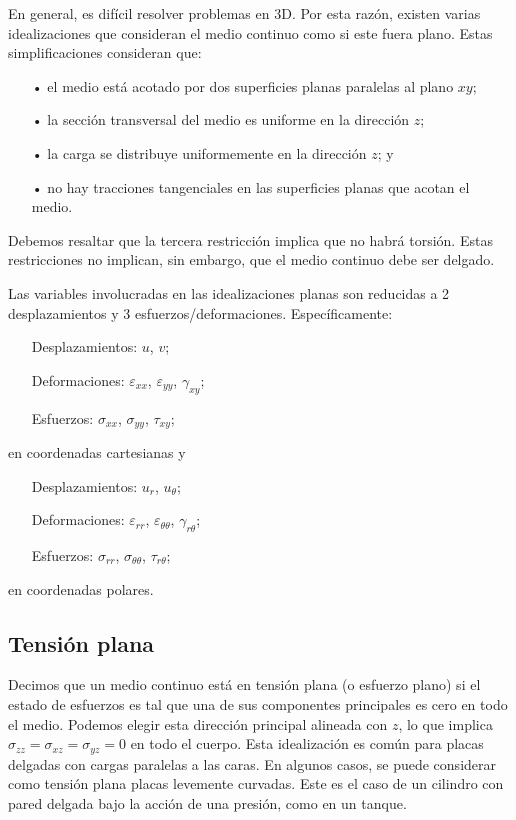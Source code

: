 \documentclass[../notas medios.tex]{subfiles}
\begin{document}
En general, es difícil resolver problemas en 3D. Por esta razón, existen varias idealizaciones que consideran el medio continuo como si este fuera plano. Estas simplificaciones consideran que:
\begin{itemize}
\item[•] el medio está acotado por dos superficies planas paralelas al plano \(xy\);
\item[•] la sección transversal del medio es uniforme en la dirección \(z\);
\item[•] la carga se distribuye uniformemente en la dirección \(z\); y
\item[•] no hay tracciones tangenciales en las superficies planas que acotan el medio.
\end{itemize}
Debemos resaltar que la tercera restricción implica que no habrá torsión. Estas restricciones no implican, sin embargo, que el medio continuo debe ser delgado.

Las variables involucradas en las idealizaciones planas son reducidas a 2 desplazamientos y 3 esfuerzos/deformaciones. Específicamente:
\begin{itemize}
\item[] Desplazamientos: \(u\), \(v\);
\item[] Deformaciones: \(\varepsilon_{xx}\), \(\varepsilon_{yy}\), \(\gamma_{xy}\); 
\item[] Esfuerzos: \(\sigma_{xx}\), \(\sigma_{yy}\), \(\tau_{xy}\);
\end{itemize}
en coordenadas cartesianas y
\begin{itemize}
\item[] Desplazamientos: \(u_r\), \(u_\theta\);
\item[] Deformaciones: \(\varepsilon_{rr}\), \(\varepsilon_{\theta\theta}\), \(\gamma_{r\theta}\); 
\item[] Esfuerzos: \(\sigma_{rr}\), \(\sigma_{\theta\theta}\), \(\tau_{r\theta}\);
\end{itemize}
en coordenadas polares.


\subsection{Tensión plana}
Decimos que un medio continuo está en tensión plana (o esfuerzo plano) si el 
estado de esfuerzos es tal que una de sus componentes principales es cero en 
todo el medio. Podemos elegir esta dirección principal alineada con \(z\), lo 
que implica \(\sigma_{zz}=\sigma_{xz}=\sigma_{yz}=0\) en todo el cuerpo. Esta 
idealización es común para placas delgadas con cargas paralelas a las caras. En 
algunos casos, se puede considerar como tensión plana placas levemente 
curvadas. Este es el caso de un cilindro con pared delgada bajo la acción de 
una presión, como en un tanque.
\end{document}
